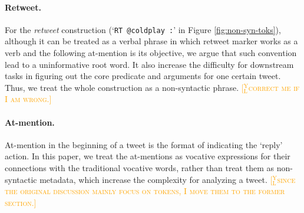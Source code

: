 \documentclass[11pt,letterpaper]{article}
\newcommand{\yjcomment}[1]{\textcolor{orange}{[$_\mathrm{L}^\mathrm{Y}$\textsc{#1}]}}
\begin{document}
\paragraph{Retweet.} For the {\it retweet} construction (`{\tt RT @coldplay :}' in Figure \ref{fig:non-syn-toks}), although it can be treated as a verbal phrase in which retweet marker works as a verb and the following at-mention is its objective, we argue that such convention lead to a uninformative root word.
It also increase the difficulty for downstream tasks in figuring out the core predicate and arguments for one certain tweet.
Thus, we treat the whole construction as a non-syntactic phrase. \yjcomment{correct me if I am wrong.}
\paragraph{At-mention.} At-mention in the beginning of a tweet is the format of indicating the `reply' action.
In this paper, we treat the at-mentions as vocative expressions for their connections with the traditional vocative words, rather than treat them as non-syntactic metadata, which increase the complexity for analyzing a tweet.
\yjcomment{since the original discussion mainly focus on tokens, I move them to the former section.}


\end{document}
